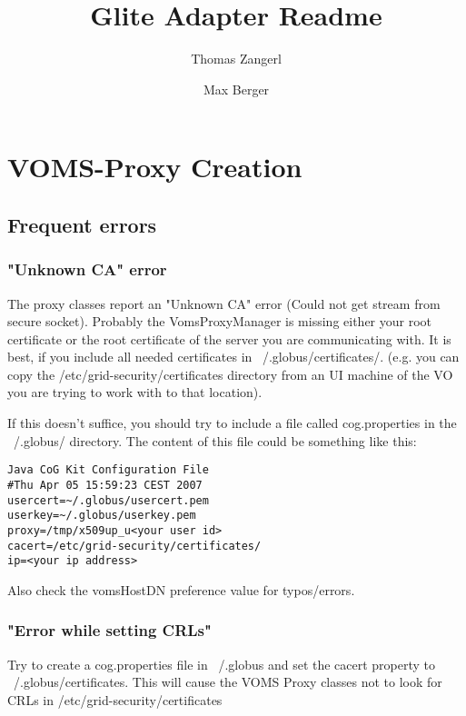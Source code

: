 \documentclass{scrreprt}
\begin{document}
\title{Glite Adapter Readme}
\author{Thomas Zangerl \and Max Berger}
\maketitle
\tableofcontents
		
\chapter{VOMS-Proxy Creation}

\section{Frequent errors}

\subsection{"Unknown CA" error}\label{unkn_ca}

The proxy classes report an "Unknown CA" error (Could not get stream from secure socket).
Probably the VomsProxyManager is missing either your root certificate
or the root certificate of the server you are communicating with.
It is best, if you include all needed certificates in ~/.globus/certificates/.
(e.g. you can copy the /etc/grid-security/certificates directory from an UI machine
of the VO you are trying to work with to that location).

If this doesn't suffice, you should try to include a file called cog.properties in the ~/.globus/
directory. The content of this file could be something like this:

\begin{verbatim}
Java CoG Kit Configuration File
#Thu Apr 05 15:59:23 CEST 2007
usercert=~/.globus/usercert.pem
userkey=~/.globus/userkey.pem
proxy=/tmp/x509up_u<your user id>
cacert=/etc/grid-security/certificates/
ip=<your ip address>
\end{verbatim}

Also check the vomsHostDN preference value for typos/errors.

\subsection{"Error while setting CRLs"}

Try to create a cog.properties file in ~/.globus and set the cacert property to ~/.globus/certificates.
This will cause the VOMS Proxy classes not to look for CRLs in /etc/grid-security/certificates
\end{document}
